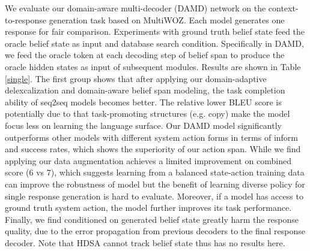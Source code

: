\documentclass[letterpaper]{article} \usepackage{aaai20}  \usepackage{times}  \usepackage{helvet} \usepackage{courier}  \usepackage[hyphens]{url}  \usepackage{graphicx} \urlstyle{rm} \def\UrlFont{\rm}  \usepackage{graphicx}  \frenchspacing  \setlength{\pdfpagewidth}{8.5in}  \setlength{\pdfpageheight}{11in}  \usepackage{multirow}
\begin{document}
	We evaluate our domain-aware multi-decoder (DAMD) network on the context-to-response generation task based on MultiWOZ. Each model generates one response for fair comparison. Experiments with ground truth belief state feed the oracle belief state as input and database search condition. Specifically in DAMD, we feed the oracle token at each decoding step of belief span to produce the oracle hidden states as input of subsequent modules. 
Results are shown in Table \ref{single}. 
	The first group shows that after applying our domain-adaptive delexcalization and domain-aware belief span modeling, the task completion ability of seq2seq models becomes better. The relative lower BLEU score is potentially due to that task-promoting structures (e.g. copy) make the model focus less on learning the language surface. Our DAMD model significantly outperforms other models with different system action forms in terms of inform and success rates, which shows the superiority of our action span. While we find applying our data augmentation achieves a limited improvement on combined score (6 vs 7), which suggests learning from a balanced state-action training data can improve the robustness of model but the benefit of learning diverse policy for single response generation is hard to evaluate. Moreover, if a model has access to ground truth system action, the model further improves its task performance. Finally, we find conditioned on generated belief state greatly harm the response quality, due to the error propagation from previous decoders to the final response decoder. Note that HDSA cannot track belief state thus has no results here. 
\end{document}
